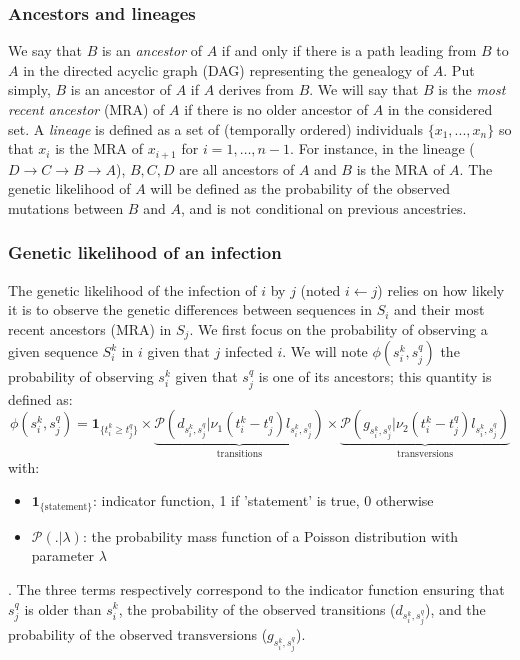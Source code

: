 \documentclass[10pt]{article}
\begin{document}
\subsubsection*{Ancestors and lineages}
\noindent We say that $B$ is an \textit{ancestor} of $A$ if and only if there is a path leading from $B$ to $A$ in the directed acyclic graph (DAG) representing the genealogy of $A$.
Put simply, $B$ is an ancestor of $A$ if $A$ derives from $B$.
We will say that $B$ is the \textit{most recent ancestor} (MRA) of $A$ if there is no older ancestor of $A$ in the considered set.
A \textit{lineage} is defined as a set of (temporally ordered) individuals $\{x_1, ..., x_n\}$ so that $x_i$ is the MRA of $x_{i+1}$ for $i=1,\ldots,n-1$.
For instance, in the lineage ($D \rightarrow C \rightarrow B \rightarrow A$), $B,C,D$ are all ancestors of $A$ and $B$ is the MRA of $A$.
The genetic likelihood of $A$ will be defined as the probability of the observed mutations between $B$ and $A$, and is not conditional on previous ancestries.
\\

\subsubsection*{Genetic likelihood of an infection}
The genetic likelihood of the infection of $i$ by $j$ (noted $i \leftarrow j$) relies on how likely it is to observe the genetic differences between sequences in $S_i$ and their most recent ancestors (MRA) in $S_j$.
We first focus on the probability of observing a given sequence $S_i^k$ in $i$ given that $j$ infected $i$.
We will note $\phi(s_i^k, s_j^q)$ the probability of observing $s_i^k$ given that $s_j^q$ is one of its ancestors; this quantity is defined as:
$$
\phi(s_i^k, s_j^q) = \mathbf{1}_{\{t_i^k \geq t_j^q\}} \times 
\underbrace{\mathcal{P}\left(d_{s_i^k,s_j^q} | \nu_1 (t_i^k - t_j^q) l_{s_i^k,s_j^q}\right)}_{\mbox{transitions}}
\times \underbrace{\mathcal{P}\left(g_{s_i^k,s_j^q} | \nu_2 (t_i^k - t_j^q) l_{s_i^k,s_j^q}\right)}_{\mbox{transversions}}
$$
with:
\begin{itemize}
\item $\mathbf{1}_{\{\mbox{statement}\}}$: indicator function, 1 if 'statement' is true, 0 otherwise
\item $\mathcal{P}(.|\lambda)$: the probability mass function of a Poisson distribution with parameter $\lambda$
\end{itemize}
. The three terms respectively correspond to the indicator function ensuring that $s_j^q$ is older than $s_i^k$, the probability of the observed transitions ($d_{s_i^k,s_j^q}$), and the probability of the observed transversions ($g_{s_i^k,s_j^q}$). 
\\
\end{document}
